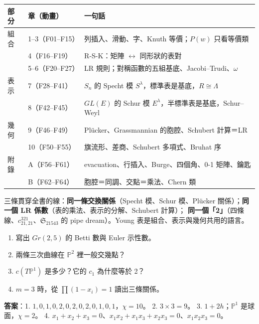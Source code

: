 \begin{keybox}[從擠數字到旗流形]
\begin{tabular}{@{}lll@{}}
部分 & 章（動畫） & 一句話\\ \midrule
組合 & 1--3（F01--F15） & 列插入、滑動、字、Knuth 等價；$P(w)$ 只看等價類\\
 & 4（F16--F19） & R-S-K：矩陣 $\leftrightarrow$ 同形狀的表對\\
 & 5--6（F20--F27） & LR 規則；對稱函數的五組基底、Jacobi–Trudi、$\omega$\\
表示 & 7（F28--F41） & $S_n$ 的 Specht 模 $S^\lambda$，標準表是基底，$R\cong\Lambda$\\
 & 8（F42--F45） & $GL(E)$ 的 Schur 模 $E^\lambda$，半標準表是基底，Schur–Weyl\\
幾何 & 9（F46--F49） & Plücker、Grassmannian 的胞腔、Schubert 計算＝LR\\
 & 10（F50--F55） & 旗流形、差商、Schubert 多項式、Bruhat 序\\
附錄 & A（F56--F61） & evacuation、行插入、Burge、四個角、0-1 矩陣、鑰匙\\
 & B（F62--F64） & 胞腔＝同調、交點＝乘法、Chern 類\\
\end{tabular}

\medskip
三條貫穿全書的線：\textbf{同一條交換關係}（Specht 模、Schur 模、Plücker 關係）；\textbf{同一個 LR 係數}（表的乘法、表示的分解、Schubert 計算）；
\textbf{同一個「2」}（四條線、$c^{321}_{21,21}$、$\mathfrak S_{21543}$ 的 pipe dream）。Young 表是組合、表示與幾何共用的語言。
\end{keybox}

\begin{notebox}[練習（答案在後面）]
\begin{enumerate}[nosep]
\item 寫出 $Gr(2,5)$ 的 Betti 數與 Euler 示性數。
\item 兩條三次曲線在 $\mathbb P^2$ 裡一般交幾點？
\item $c(T\mathbb P^1)$ 是多少？它的 $c_1$ 為什麼等於 2？
\item $m=3$ 時，從 $\prod(1-x_i)=1$ 讀出三條關係。
\end{enumerate}
\textbf{答案}：1. $1,0,1,0,2,0,2,0,2,0,1,0,1$，$\chi=10$。
2. $3\times3=9$。
3. $1+2h$；$\mathbb P^1$ 是球面，$\chi=2$。
4. $x_1+x_2+x_3=0$、$x_1x_2+x_1x_3+x_2x_3=0$、$x_1x_2x_3=0$。
\end{notebox}
